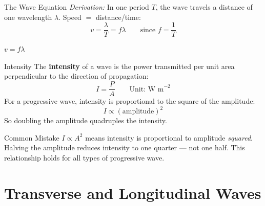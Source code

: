 \begin{center}
\end{center}

\begin{formulabox}{The Wave Equation}
\textit{Derivation:} In one period $T$, the wave travels a distance of one wavelength $\lambda$. Speed $=$ distance/time:
$$v = \frac{\lambda}{T} = f\lambda \qquad \text{since } f = \frac{1}{T}$$
\begin{center}
\Large $v = f\lambda$
\end{center}
\end{formulabox}

\begin{formulabox}{Intensity}
The \textbf{intensity} of a wave is the power transmitted per unit area perpendicular to the direction of propagation:
$$I = \frac{P}{A} \qquad \text{Unit: W m}^{-2}$$
For a progressive wave, intensity is proportional to the square of the amplitude:
$$I \propto (\text{amplitude})^2$$
So doubling the amplitude quadruples the intensity.
\end{formulabox}

\begin{warningbox}{Common Mistake}
$I \propto A^2$ means intensity is proportional to amplitude \emph{squared}. Halving the amplitude reduces intensity to one quarter — not one half. This relationship holds for all types of progressive wave.
\end{warningbox}

\section{Transverse and Longitudinal Waves}

